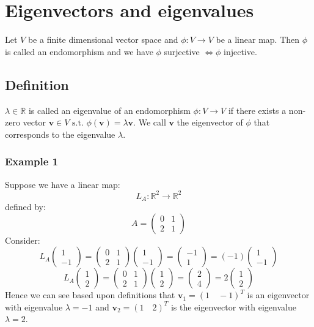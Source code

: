 \documentclass[12pt]{article}
\newcommand{\st}{\text{ s.t. }}
\begin{document}
\section{Eigenvectors and eigenvalues}
Let \(V\) be a finite dimensional vector space and \(\phi:V\to V\) be a linear map. Then \(\phi\) is called an endomorphism and we have \(\phi\) surjective \(\iff\phi\) injective.
\subsection*{Definition}
\(\lambda\in \mathbb{R}\) is called an eigenvalue of an endomorphism \(\phi:V\to V\) if there exists a non-zero vector \(\textbf{v}\in V\st \phi(\textbf{v})=\lambda\textbf{v}\). We call \(\textbf{v}\) the eigenvector of \(\phi\) that corresponds to the eigenvalue \(\lambda\).
\subsubsection*{Example 1}
Suppose we have a linear map:
\[L_A:\mathbb{R}^2\to\mathbb{R}^2\]
defined by:
\[A=\begin{pmatrix}
    0 & 1 \\
    2 & 1
\end{pmatrix}\]
Consider:
\[L_A\begin{pmatrix}
    1 \\ -1
\end{pmatrix}=\begin{pmatrix}
    0 & 1 \\
    2 & 1
\end{pmatrix}\begin{pmatrix}
    1 \\ -1
\end{pmatrix}=\begin{pmatrix}
    -1 \\ 1
\end{pmatrix}=(-1)\begin{pmatrix}
    1 \\ -1
\end{pmatrix}\]
\[L_A\begin{pmatrix}
    1 \\ 2
\end{pmatrix}=\begin{pmatrix}
    0 & 1 \\
    2 & 1
\end{pmatrix}\begin{pmatrix}
    1\\ 2
\end{pmatrix}=\begin{pmatrix}
    2 \\ 4
\end{pmatrix}=2\begin{pmatrix}
    1 \\2
\end{pmatrix}\]
Hence we can see based upon definitions that \(\textbf{v}_1=(1\quad -1)^T\) is an eigenvector with eigenvalue \(\lambda=-1\)
and \(\textbf{v}_2=(1\quad 2)^T\) is the eigenvector with eigenvalue \(\lambda=2\).
\end{document}
